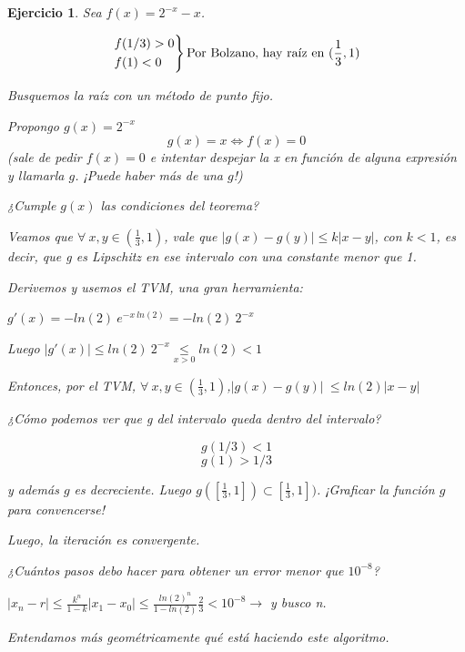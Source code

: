 \documentclass{article}
\newtheorem{exercise}{Ejercicio}
\begin{document}
\begin{exercise}
Sea $f(x)=2^{-x}-x$.

\[
\begin{rcases*}
f(1/3) > 0 \\
f(1) < 0
\end{rcases*} \text{Por Bolzano, hay raíz en } (\frac{1}{3},1)
\]

Busquemos la raíz con un método de punto fijo.

Propongo $g(x) = 2^{-x}$
$$g(x) = x \Leftrightarrow f(x)=0$$ (sale de pedir $f(x)=0$ e intentar despejar la x en función de alguna expresión y llamarla $g$. ¡Puede haber más de una $g$!)



¿Cumple $g(x)$ las condiciones del teorema?

Veamos que $\forall\ x,y\in (\frac{1}{3},1)$, vale que $|g(x)-g(y)| \leq k |x-y|$, con $k < 1$, es decir, que g es Lipschitz en ese intervalo con una constante menor que 1.

Derivemos y usemos el TVM, una gran herramienta:

$g'(x)=-ln(2)\ e^{-x\ ln(2)} = - ln(2)\ 2^{-x}$

Luego $|g'(x)| \leq ln(2)\ 2^{-x} \underset{x > 0}{\leq} ln(2) < 1$

Entonces, por el TVM,  $\forall\ x,y\in (\frac{1}{3},1)$,$|g(x)-g(y)|\ \leq ln(2) |x-y|$

¿Cómo podemos ver que g del intervalo queda dentro del intervalo?

$$g(1/3) < 1$$
$$g(1) > 1/3$$

y además $g$ es decreciente. Luego $g([\frac{1}{3},1]) \subset [\frac{1}{3},1])$. ¡Graficar la función $g$ para convencerse!

Luego, la iteración es convergente.

¿Cuántos pasos debo hacer para obtener un error menor que $10^{-8}$? \bigskip

$|x_n-r| \leq \frac{k^n}{1-k} |x_1-x_0| \leq \frac{ln(2)^n}{1-ln(2)} \frac{2}{3} < 10^{-8} \rightarrow$ y busco n.


 

Entendamos más geométricamente qué está haciendo este algoritmo.


\end{exercise}
\end{document}

